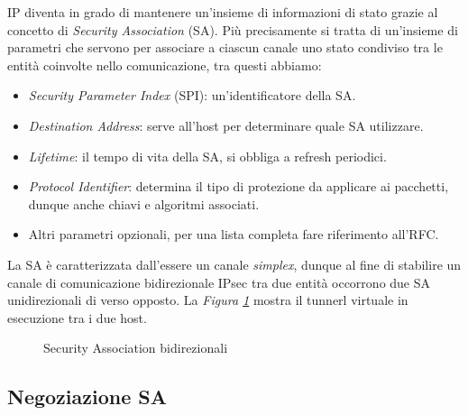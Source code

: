 \noindent 
IP diventa in grado di mantenere un'insieme di informazioni di stato grazie al concetto di \textit{Security Association} (SA).
Più precisamente si tratta di un'insieme di parametri che servono per associare a ciascun canale uno stato condiviso tra le entità coinvolte nello comunicazione,
tra questi abbiamo:

\begin{itemize}
    \item \textit{Security Parameter Index} (SPI): un'identificatore della SA.
    \item \textit{Destination Address}: serve all'host per determinare quale SA utilizzare. 
    \item \textit{Lifetime}: il tempo di vita della SA, si obbliga a refresh periodici.
    \item \textit{Protocol Identifier}: determina il tipo di protezione da applicare ai pacchetti, dunque anche chiavi e algoritmi associati.
    \item Altri parametri opzionali, per una lista completa fare riferimento all'RFC.
\end{itemize}

\noindent
La SA è caratterizzata dall'essere un canale \textit{simplex}, dunque al fine di stabilire un canale di comunicazione bidirezionale IPsec tra due entità occorrono due SA unidirezionali di verso opposto.
La \textit{Figura \ref{fig:sa_bidirezionale}} mostra il tunnerl virtuale in esecuzione tra i due host.

\begin{figure}[h!]
    \centering
    \vspace{0.4cm}
    \caption{Security Association bidirezionali}
    \label{fig:sa_bidirezionale}
\end{figure}

\noindent

\subsection{Negoziazione SA}

